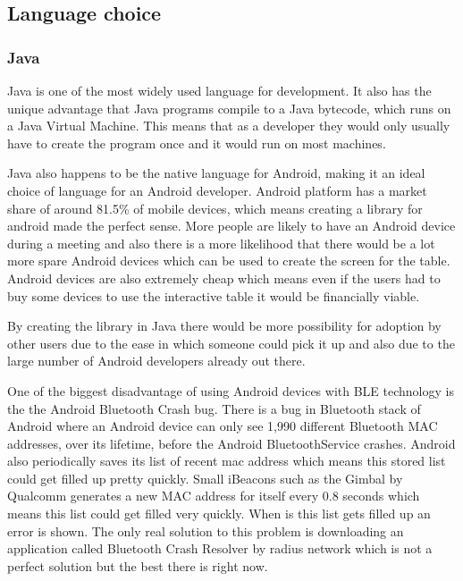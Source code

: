 \subsection{Language choice}


\subsubsection{Java} \label{java}

Java is one of the most widely used language for development. It also
has the unique advantage that Java programs compile to a Java bytecode,
which runs on a Java Virtual Machine. This means that as a developer
they would only usually have to create the program once and it would
run on most machines. 

Java also happens to be the native language for Android, making it
an ideal choice of language for an Android developer. Android platform
has a market share of around 81.5\% of mobile devices\cite{market-share}, which means
creating a library for android made the perfect sense. More people
are likely to have an Android device during a meeting and also there
is a more likelihood that there would be a lot more spare Android devices
which can be used to create the screen for the table. Android devices
are also extremely cheap which means even if the users had to buy
some devices to use the interactive table it would be financially viable\cite{cheap-android}.

By creating the library in Java there would be more possibility for
adoption by other users due to the ease in which someone could pick
it up and also due to the large number of Android developers already out there. 


One of the biggest disadvantage of using Android devices with BLE
technology is the the Android Bluetooth Crash bug\cite{bluetooth-share}.
There is a bug in Bluetooth stack of Android where an Android device
can only see 1,990 different Bluetooth MAC addresses, over its lifetime, before the Android
BluetoothService crashes. Android also periodically saves its list
of recent mac address which means this stored list could get filled
up pretty quickly. Small iBeacons such as the Gimbal by Qualcomm generates
a new MAC address for itself every 0.8 seconds which means this list
could get filled very quickly. When is this list gets filled up an
error is shown. The only real solution to this
problem is downloading an application called Bluetooth Crash Resolver by radius
network which is not a perfect solution but the best there is right
now.


